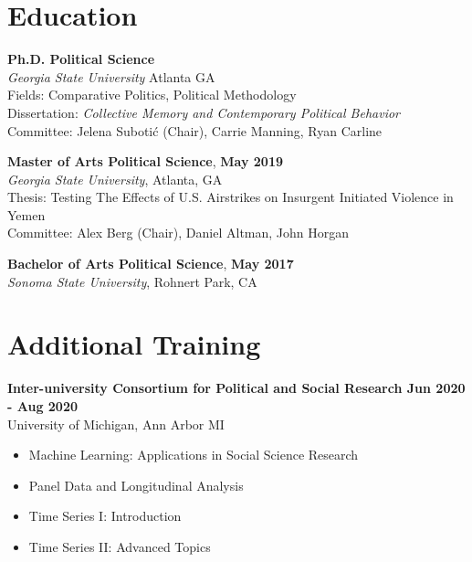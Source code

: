 \documentclass[margin]{res}
\newcommand{\fullhrulefill}{%
  \hspace*{-\sectionwidth}\hrulefill%
  }
\begin{document}
\begin{resume}

\fullhrulefill
\section{Education}
\textbf {Ph.D. Political Science}\\
{\sl Georgia State University} Atlanta GA \\
{Fields: Comparative Politics, Political Methodology} \\
Dissertation: \textit{Collective Memory and Contemporary Political Behavior} \\
Committee: Jelena Subotić (Chair), Carrie Manning, Ryan Carline

\textbf{Master of Arts Political Science}, \hfill{\textbf{May 2019}}\\
{\sl Georgia State University}, Atlanta, GA\\
 Thesis: Testing The Effects of U.S. Airstrikes on Insurgent Initiated Violence in Yemen  \\
Committee: Alex Berg (Chair), Daniel Altman, John Horgan

\textbf{Bachelor of Arts Political Science}, \textbf{\hfill{May 2017}} \\
{\sl Sonoma State University}, Rohnert Park, CA


\fullhrulefill
\section{Additional Training}
\textbf{Inter-university Consortium for Political and Social Research \hfill{Jun 2020 - Aug 2020}}\\ University of Michigan, Ann Arbor MI \\ 
\begin{itemize}
	\item Machine Learning: Applications in Social Science Research
	\item Panel Data and Longitudinal Analysis
	\item Time Series I: Introduction
	\item Time Series II: Advanced Topics
\end{itemize}


\end{resume}
\end{document}
